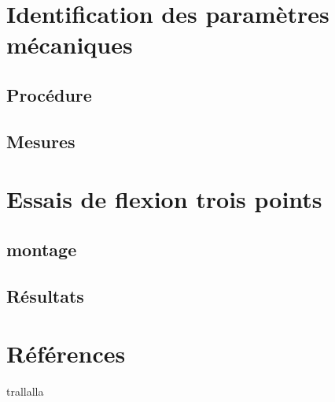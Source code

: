 \documentclass[12pt]{report}
\begin{document}
\chapter{Identification des paramètres mécaniques
}
\section{Procédure}


\section{Mesures}


\chapter{Essais de flexion trois points}
\section{montage}


\section{Résultats}


\chapter*{Références}
trallalla
\end{document}
